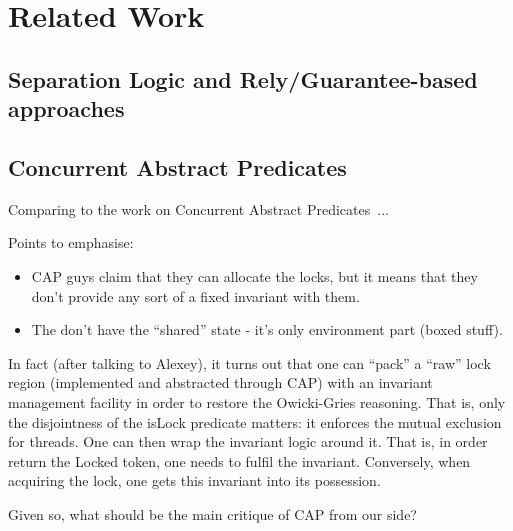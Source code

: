 
\section{Related Work}
\label{sec:related-work}


\subsection{Separation Logic and Rely/Guarantee-based approaches}
\label{sec:separ-logic-relyg}



\subsection{Concurrent Abstract Predicates}
\label{sec:conc-abstr-pred}

Comparing to the work on Concurrent Abstract Predicates~\cite{DinsdaleYoung-al:ECOOP10}...

Points to emphasise:

\begin{itemize}

\item CAP guys claim that they can allocate the locks, but it means
  that they don't provide any sort of a fixed invariant with them. 

\item The don't have the ``shared'' state - it's only environment part
  (boxed stuff). 

\end{itemize}

In fact (after talking to Alexey), it turns out that one can ``pack''
a ``raw'' lock region (implemented and abstracted through CAP) with an
invariant management facility in order to restore the Owicki-Gries
reasoning. That is, only the disjointness of the \textsf{isLock}
predicate matters: it enforces the mutual exclusion for threads. One
can then wrap the invariant logic around it. That is, in order return
the \textsf{Locked} token, one needs to fulfil the
invariant. Conversely, when acquiring the lock, one gets this invariant
into its possession. 

Given so, what should be the main critique of CAP from our side?

